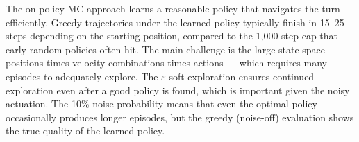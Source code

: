 \documentclass[11pt]{article}
\begin{document}
The on-policy MC approach learns a reasonable policy that navigates the turn efficiently. Greedy trajectories under the learned policy typically finish in 15--25 steps depending on the starting position, compared to the 1{,}000-step cap that early random policies often hit. The main challenge is the large state space --- positions times velocity combinations times actions --- which requires many episodes to adequately explore. The $\varepsilon$-soft exploration ensures continued exploration even after a good policy is found, which is important given the noisy actuation. The 10\% noise probability means that even the optimal policy occasionally produces longer episodes, but the greedy (noise-off) evaluation shows the true quality of the learned policy.
\end{document}
